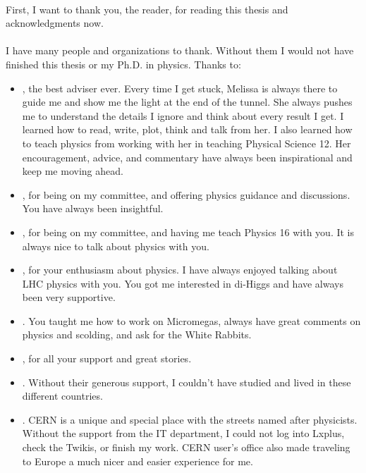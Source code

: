 
\paragraph{}
First, I want to thank you, the reader, for reading this thesis and acknowledgments now. 
\paragraph{}
I have many people and organizations to thank. Without them I would not have finished this thesis or my Ph.D. in physics. Thanks to:
\begin{itemize}
	\item {}, the best adviser ever. Every time I get stuck, Melissa is always there to guide me and show me the light at the end of the tunnel. She always pushes me to understand the details I ignore and think about every result I get. I learned how to read, write, plot, think and talk from her. I also learned how to teach physics from working with her in teaching Physical Science 12. Her encouragement, advice, and commentary have always been inspirational and keep me moving ahead.
	\item {}, for being on my committee, and offering physics guidance and discussions. You have always been insightful.
	\item {}, for being on my committee, and having me teach Physics 16 with you. It is always nice to talk about physics with you.
	\item {}, for your enthusiasm about physics. I have always enjoyed talking about LHC physics with you. You got me interested in di-Higgs and have always been very supportive.
	\item {}. You taught me how to work on Micromegas, always have great comments on physics and scolding, and ask for the White Rabbits.
	\item {}, for all your support and great stories.
	\item {}. Without their generous support, I couldn't have studied and lived in these different countries.
	\item {}. CERN is a unique and special place with the streets named after physicists. Without the support from the IT department, I could not log into Lxplus, check the Twikis, or finish my work. CERN user's office also made traveling to Europe a much nicer and easier experience for me.

\end{itemize}
